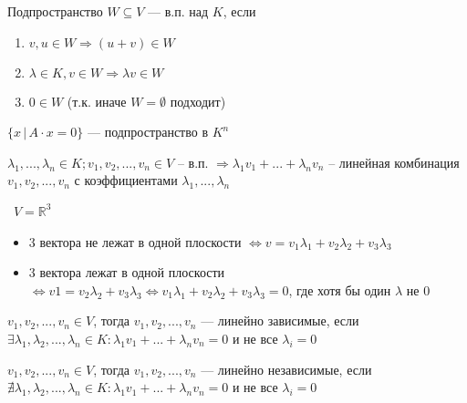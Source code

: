\newpage
\begin{definition}
    Подпространство $W \subseteq V$ --- в.п. над $K$, если
    \begin{enumerate}
        \item $v, u \in W \Longrightarrow (u + v) \in W$
        \item $\lambda \in K, v \in W \Longrightarrow \lambda v \in W$
        \item $0 \in W$ (т.к. иначе $W = \emptyset$ подходит)
    \end{enumerate}
\end{definition}

\quad

\begin{example}
    $\{ x \,| \, A \cdot x = 0 \} $ --- подпространство в $K ^ n$
\end{example}



\begin{definition}
    $\lambda_1, ..., \lambda_n \in K; v_1, v_2, ..., v_n \in V $ -- в.п. $\Longrightarrow \lambda_1 v_1 + ... + \lambda_n v_n$ -- линейная комбинация $v_1, v_2, ..., v_n$ с коэффициентами $\lambda_1, ..., \lambda_n$ 
\end{definition}

\begin{motivation} 

    \quad\, $V = \mathbb{R} ^ 3$
    \begin{itemize}
        \item 3 вектора не лежат в одной плоскости $\Longleftrightarrow v = v_1\lambda_1 + v_2\lambda_2 + v_3\lambda_3$ 
        \item 3 вектора лежат в одной плоскости $\Longleftrightarrow v1 = v_2\lambda_2 + v_3\lambda_3 \Longleftrightarrow v_1\lambda_1 + v_2\lambda_2 + v_3\lambda_3 = 0$, где хотя бы один $\lambda$ не 0 
    \end{itemize} 
    
\end{motivation}


\begin{definition}
    $v_1, v_2, ..., v_n \in V$, тогда $v_1, v_2, ..., v_n$ --- линейно зависимые, если \\ $\exists \lambda_1, \lambda_2, ..., \lambda_n \in K : \lambda_1 v_1 + ... + \lambda_n v_n = 0$ и не все $\lambda_i = 0$
\end{definition}

\begin{definition}
    $v_1, v_2, ..., v_n \in V$, тогда $v_1, v_2, ..., v_n$ --- линейно независимые, если \\ $\nexists \lambda_1, \lambda_2, ..., \lambda_n \in K : \lambda_1 v_1 + ... + \lambda_n v_n = 0$ и не все $\lambda_i = 0$
\end{definition}
